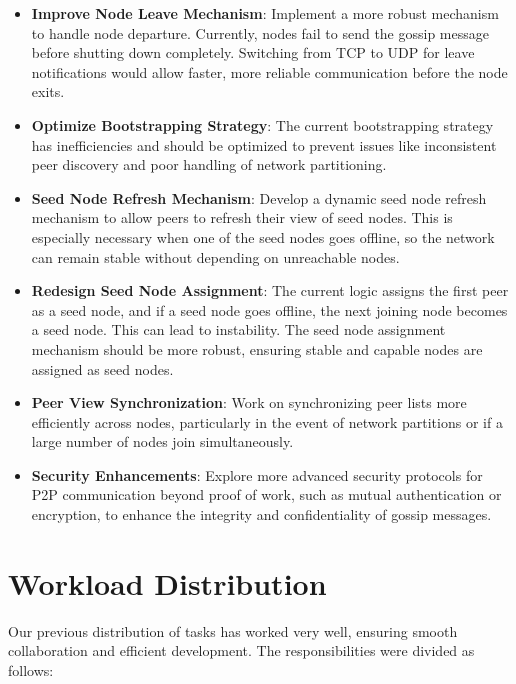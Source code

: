 \begin{itemize}
    \item \textbf{Improve Node Leave Mechanism}: Implement a more robust mechanism to handle node departure. Currently, nodes fail to send the gossip message before shutting down completely. Switching from TCP to UDP for leave notifications would allow faster, more reliable communication before the node exits.

    \item \textbf{Optimize Bootstrapping Strategy}: The current bootstrapping strategy has inefficiencies and should be optimized to prevent issues like inconsistent peer discovery and poor handling of network partitioning.

    \item \textbf{Seed Node Refresh Mechanism}: Develop a dynamic seed node refresh mechanism to allow peers to refresh their view of seed nodes. This is especially necessary when one of the seed nodes goes offline, so the network can remain stable without depending on unreachable nodes.

    \item \textbf{Redesign Seed Node Assignment}: The current logic assigns the first peer as a seed node, and if a seed node goes offline, the next joining node becomes a seed node. This can lead to instability. The seed node assignment mechanism should be more robust, ensuring stable and capable nodes are assigned as seed nodes.
    
    \item \textbf{Peer View Synchronization}: Work on synchronizing peer lists more efficiently across nodes, particularly in the event of network partitions or if a large number of nodes join simultaneously.
    
    \item \textbf{Security Enhancements}: Explore more advanced security protocols for P2P communication beyond proof of work, such as mutual authentication or encryption, to enhance the integrity and confidentiality of gossip messages.
\end{itemize}

\section{Workload Distribution}
Our previous distribution of tasks has worked very well, ensuring smooth collaboration and efficient development. The responsibilities were divided as follows:

